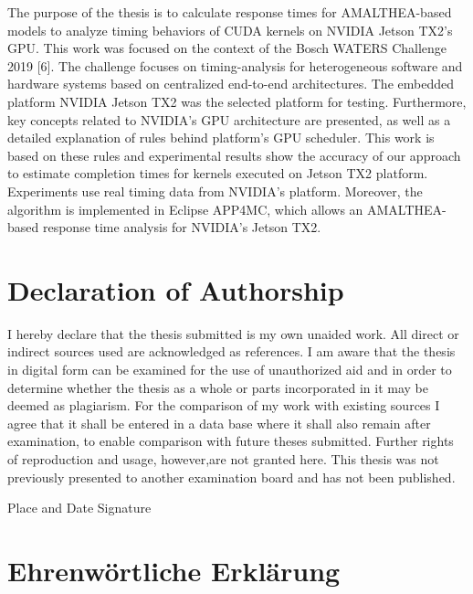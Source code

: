 \documentclass[
  12pt,
  a4paperpaper,
]{report}
\begin{document}
The purpose of the thesis is to calculate response times for
AMALTHEA-based models to analyze timing behaviors of CUDA kernels on
NVIDIA Jetson TX2's GPU. This work was focused on the context of the Bosch
WATERS Challenge 2019 {[}6{]}. The challenge focuses on timing-analysis for
heterogeneous software and hardware systems based on centralized end-to-end
architectures. The embedded platform NVIDIA Jetson TX2 was the selected platform for
testing. Furthermore, key concepts related to NVIDIA's GPU architecture
are presented, as well as a detailed explanation of rules behind
platform's GPU scheduler.
This work is based on these rules and experimental results show
the accuracy of our approach to estimate completion times for kernels
executed on Jetson TX2 platform. Experiments use real timing data from NVIDIA's
platform. Moreover, the algorithm is implemented in  Eclipse APP4MC, which allows an AMALTHEA-based response time analysis for NVIDIA's Jetson TX2.

\setcounter{page}{1}

\hypertarget{declaration-of-authorship}{%
\chapter*{Declaration of Authorship}\label{declaration-of-authorship}}

I hereby declare that the thesis submitted is my own unaided work. All
direct or indirect sources used are acknowledged as references. I am
aware that the thesis in digital form can be examined for the use of
unauthorized aid and in order to determine whether the thesis as a whole
or parts incorporated in it may be deemed as plagiarism. For the
comparison of my work with existing sources I agree that it shall be
entered in a data base where it shall also remain after examination, to
enable comparison with future theses submitted. Further rights of
reproduction and usage, however,are not granted here. This thesis was
not previously presented to another examination board and has not been
published.

Place and Date
\quad\quad\quad\quad\quad\quad\quad\quad\quad\quad\quad\quad\quad\quad Signature

\hypertarget{ehrenwuxf6rtliche-erkluxe4rung}{%
\chapter*{Ehrenwörtliche
Erklärung}\label{ehrenwuxf6rtliche-erkluxe4rung}}
\end{document}
